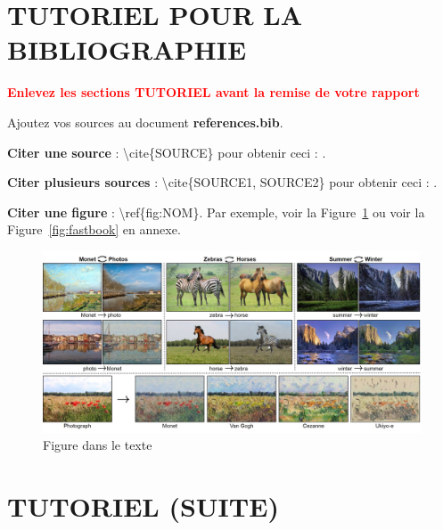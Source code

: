 \documentclass[12pt]{article} 	%
\begin{document}
\section{TUTORIEL POUR LA BIBLIOGRAPHIE}

\textbf{
	\textcolor{red}{
		Enlevez les sections TUTORIEL avant la remise de votre rapport
						   }	
           }

Ajoutez vos sources au document \textbf{references.bib}.

\textbf{Citer une source} : \textbackslash cite\{SOURCE\} pour obtenir ceci : \cite{howard2020deep}.

\textbf{Citer plusieurs sources} : \textbackslash cite\{SOURCE1, SOURCE2\} pour obtenir ceci : \cite{goodfellow2014generative, CycleGAN2017}.

\textbf{Citer une figure} : \textbackslash ref\{fig:NOM\}. Par exemple, voir la Figure~\ref{fig:gan} ou voir la Figure~\ref{fig:fastbook} en annexe.

\begin{figure}[h!]
	\begin{center}
		\includegraphics[scale=0.4]{img/gan_img.jpg}
	\end{center}
  \caption{Figure dans le texte~\cite{CycleGAN2017}}
  \label{fig:gan}
\end{figure}

\newpage
\appendix

\section{TUTORIEL (SUITE)}
\end{document}
